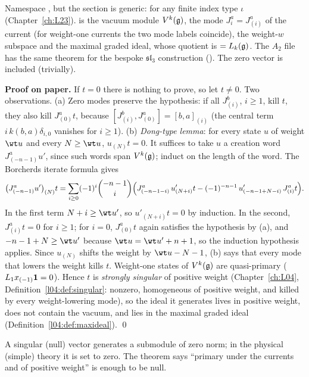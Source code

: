 \begin{dictionary}
Namespace , but the section is generic:  for any finite
index type $\iota$ (Chapter~\ref{ch:L23}).  is the vacuum module $V^k(\mathfrak g)$,
 the mode $J^a_i=J^a_{(i)}$ of the current (for weight-one currents the two mode labels
coincide),  the weight-$w$ subspace and  the maximal graded
ideal, whose quotient is  $=L_k(\mathfrak g)$. The $A_2$ file
 has the same theorem for the bespoke
$\mathfrak{sl}_3$ construction (). The zero vector is included (trivially).
\end{dictionary}

\textbf{Proof on paper.} If $t=0$ there is nothing to prove, so let $t\neq0$. Two observations.
(a) Zero modes preserve the hypothesis: if all $J^b_{(i)}$, $i\ge1$, kill $t$, they also kill $J^a_{(0)}t$, because
$[J^b_{(i)},J^a_{(0)}]=[b,a]_{(i)}$ (the central term $i\,k(b,a)\delta_{i,0}$ vanishes for $i\ge1$).
(b) \emph{Dong-type lemma}: for every state $u$ of weight $\wt u$ and every $N\ge\wt u$, $u_{(N)}t=0$. It suffices to take
$u$ a creation word $J^a_{(-n-1)}u'$, since such words span $V^k(\mathfrak g)$; induct on the length of the word. The
Borcherds iterate formula gives
\begin{equation*}
\bigl(J^a_{(-n-1)}u'\bigr)_{(N)}t=\sum_{i\ge0}(-1)^i\binom{-n-1}{i}\Bigl(J^a_{(-n-1-i)}\,u'_{(N+i)}t-(-1)^{-n-1}\,u'_{(-n-1+N-i)}\,J^a_{(i)}t\Bigr).
\end{equation*}
In the first term $N+i\ge\wt u'$, so $u'_{(N+i)}t=0$ by induction. In the second, $J^a_{(i)}t=0$ for $i\ge1$; for $i=0$,
$J^a_{(0)}t$ again satisfies the hypothesis by (a), and $-n-1+N\ge\wt u'$ because $\wt u=\wt u'+n+1$, so the induction
hypothesis applies. Since $u_{(N)}$ shifts the weight by $\wt u-N-1$, (b) says that every mode that lowers the weight
kills $t$. Weight-one states of $V^k(\mathfrak g)$ are quasi-primary ($L_1x_{(-1)}\mathbf 1=0$). Hence $t$ is
\emph{strongly singular} of positive weight (Chapter~\ref{ch:L04}, Definition~\ref{l04:def:singular}: nonzero,
homogeneous of positive weight, and killed by every weight-lowering mode), so the ideal it generates lives in positive
weight, does not contain the vacuum, and lies in the maximal graded ideal (Definition~\ref{l04:def:maxideal}). \qed

\begin{physics}
A singular (null) vector generates a submodule of zero norm; in the physical (simple) theory it is set to
zero. The theorem says ``primary under the currents and of positive weight'' is enough to be null.
\end{physics}

